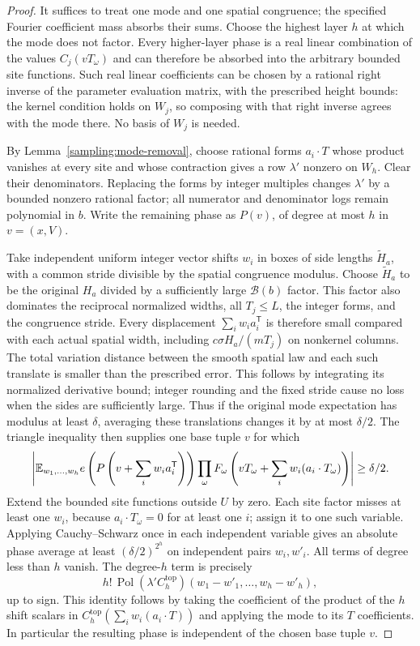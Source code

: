 \begin{proof}
It suffices to treat one mode and one spatial congruence; the specified
Fourier coefficient mass absorbs their sums.  Choose the highest layer
$h$ at which the mode does not factor.  Every higher-layer phase is a real
linear combination of the values $C_j(vT_\omega)$ and can therefore be
absorbed into the arbitrary bounded site functions.  Such real linear
coefficients can be chosen by a rational right inverse of the parameter
evaluation matrix, with the prescribed height bounds: the kernel condition
holds on $W_j$, so composing with that right inverse agrees with the mode
there.  No basis of $W_j$ is needed.

By Lemma~\ref{sampling:mode-removal}, choose rational forms $a_i\cdot T$
whose product vanishes at every site and whose contraction gives a row
$\lambda'$ nonzero on $W_h$.  Clear their denominators.  Replacing the
forms by integer multiples changes $\lambda'$ by a bounded nonzero rational
factor; all numerator and denominator logs remain polynomial in $b$.
Write the remaining phase as $P(v)$, of degree at most $h$ in $v=(x,V)$.

Take independent uniform integer vector shifts $w_i$ in boxes of side
lengths $\widetilde H_a$, with a common stride divisible by the spatial
congruence modulus.  Choose $\widetilde H_a$ to be the original $H_a$
divided by a sufficiently large $\mathcal B(b)$ factor.  This factor
also dominates the reciprocal normalized widths, all $T_j\le L$, the
integer forms, and the congruence stride.  Every displacement
$\sum_iw_ia_i^{\mathsf T}$ is therefore small compared with each actual
spatial width, including $c\sigma H_a/(mT_j)$ on nonkernel columns.
The total variation distance between the smooth spatial law
and each such translate is smaller than the prescribed error.  This
follows by integrating its normalized derivative bound; integer rounding
and the fixed stride cause no loss when the sides are sufficiently large.
Thus if the original mode expectation has modulus at least $\delta$,
averaging these translations changes it by at most $\delta/2$.
The triangle inequality then supplies one base tuple $v$ for which
\[
 \left|\mathbb E_{w_1,\ldots,w_h}
 e\left(P\left(v+\sum_iw_ia_i^{\mathsf T}\right)\right)
 \prod_\omega F_\omega\left(
    vT_\omega+\sum_iw_i(a_i\cdot T_\omega)\right)\right|
 \ge\delta/2.
\]
Extend the bounded site functions outside $U$ by zero.  Each site factor
misses at least one $w_i$, because $a_i\cdot T_\omega=0$ for at least
one $i$; assign it to one such variable.  Applying
Cauchy--Schwarz once
in each independent variable gives an absolute phase average at least
$(\delta/2)^{2^h}$ on independent pairs $w_i,w'_i$.
All terms of degree less than $h$ vanish.  The degree-$h$ term is precisely
\[
 h!\,\operatorname{Pol}(\lambda'C_h^{\mathrm{top}})
 (w_1-w'_1,\ldots,w_h-w'_h),
\]
up to sign.  This identity follows by taking the coefficient of the product
of the $h$ shift scalars in
$C_h^{\mathrm{top}}(\sum_iw_i(a_i\cdot T))$ and applying the mode to its
$T$ coefficients.  In particular the resulting phase is independent of
the chosen base tuple $v$.


\end{proof}
